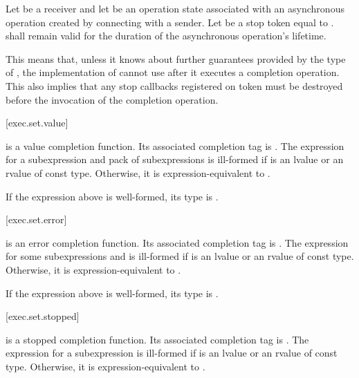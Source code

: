 \pnum
Let  be a receiver and
let  be an operation state associated with
an asynchronous operation created by connecting  with a sender.
Let  be a stop token equal to
.
 shall remain valid
for the duration of the asynchronous operation's lifetime.
\begin{note}
This means that, unless it knows about further guarantees
provided by the type of ,
the implementation of  cannot use 
after it executes a completion operation.
This also implies that any stop callbacks registered on token
must be destroyed before the invocation of the completion operation.
\end{note}

[exec.set.value]{}

\pnum
{} is a value completion function.
Its associated completion tag is .
The expression 
for a subexpression  and
pack of subexpressions  is ill-formed
if  is an lvalue or an rvalue of const type.
Otherwise, it is expression-equivalent to
.

\mandates
If the expression above is well-formed, its type is .

[exec.set.error]{}

\pnum
{} is an error completion function.
Its associated completion tag is .
The expression 
for some subexpressions  and  is ill-formed
if  is an lvalue or an rvalue of const type.
Otherwise, it is expression-equivalent to
.

\mandates
If the expression above is well-formed, its type is .

[exec.set.stopped]{}

\pnum
{} is a stopped completion function.
Its associated completion tag is .
The expression 
for a subexpression  is ill-formed
if  is an lvalue or an rvalue of const type.
Otherwise, it is expression-equivalent to
.

